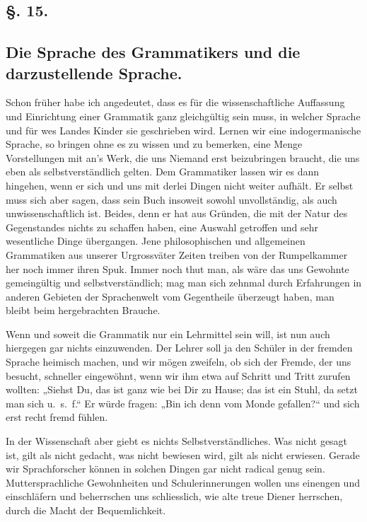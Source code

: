 \label{fp.127}

\subsection*{§. 15.}\label{II.VI.15}
\subsection*{Die Sprache des Grammatikers und die darzustellende Sprache.}

\largerpage[-1]
Schon früher habe ich angedeutet, dass es für die wissenschaftliche Auffassung und Einrichtung einer Grammatik ganz gleichgültig sein muss, in welcher Sprache und für wes Landes Kinder sie geschrieben wird. Lernen wir eine indogermanische Sprache, so bringen  ohne es zu wissen und zu bemerken, eine Menge Vorstellungen mit an’s Werk, die uns Niemand erst beizubringen braucht, die uns eben als selbstverständlich gelten. Dem Grammatiker lassen wir es dann hingehen, wenn er sich und uns mit derlei Dingen nicht weiter aufhält. Er selbst muss sich aber sagen, dass sein Buch insoweit sowohl unvollständig, als auch unwissenschaftlich ist. Beides, denn er hat aus Gründen, die mit der Natur des Gegenstandes nichts zu schaffen haben, eine Auswahl getroffen und sehr wesentliche Dinge übergangen. Jene philosophischen und allgemeinen Grammatiken aus unserer Urgrossväter Zeiten treiben von der Rumpelkammer her noch immer ihren Spuk. Immer noch thut man, als wäre das uns Gewohnte gemeingültig und selbstverständlich; mag man sich zehnmal durch Erfahrungen in anderen Gebieten der Sprachenwelt vom Gegentheile überzeugt haben, man bleibt beim hergebrachten Brauche.

Wenn und soweit die Grammatik nur ein Lehrmittel sein will, ist nun auch hiergegen gar nichts einzuwenden. Der Lehrer soll ja den Schüler in der fremden Sprache heimisch machen, und wir mögen zweifeln, ob sich der Fremde, der uns besucht, schneller eingewöhnt, wenn wir ihm etwa auf Schritt und Tritt zurufen wollten: „Siehst Du, das ist ganz wie bei Dir zu Hause; das ist ein Stuhl, da setzt man sich  u.~s.~f.“ Er würde fragen: „Bin ich denn vom Monde gefallen?“ und sich erst recht fremd fühlen.

In der Wissenschaft aber giebt es nichts Selbstverständliches. Was nicht gesagt ist, gilt als nicht gedacht, was nicht bewiesen wird, gilt als nicht erwiesen. Gerade wir Sprachforscher können in solchen Dingen gar nicht radical genug sein. Muttersprachliche Gewohnheiten und Schulerinnerungen wollen uns einengen und einschläfern und beherrschen uns schliesslich, wie alte treue Diener herrschen, durch die Macht der Bequemlichkeit.

